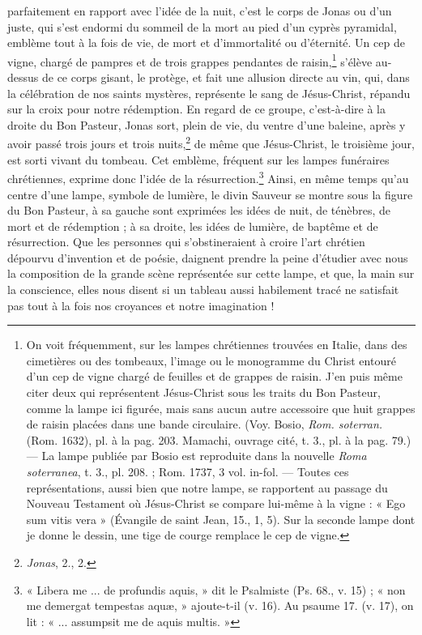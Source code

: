 \documentclass{article}
\begin{document}
parfaitement en rapport avec l'idée de la nuit, c'est le corps de Jonas ou d'un juste, qui s'est endormi du sommeil de la mort au pied d'un cyprès pyramidal, emblème tout à la fois de vie, de mort et d'immortalité ou d'éternité. Un cep de vigne, chargé de pampres et de trois grappes pendantes de raisin,\footnote{On voit fréquemment, sur les lampes chrétiennes trouvées en Italie, dans des cimetières ou des tombeaux, l'image ou le monogramme du Christ entouré d'un cep de vigne chargé de feuilles et de grappes de raisin. J'en puis même citer deux qui représentent Jésus-Christ sous les traits du Bon Pasteur, comme la lampe ici figurée, mais sans aucun autre accessoire que huit grappes de raisin placées dans une bande circulaire. (Voy. Bosio, \emph{Rom. soterran.} (Rom. 1632), pl. à la pag. 203. Mamachi, ouvrage cité, t. 3., pl. à la pag. 79.) --- La lampe publiée par Bosio est reproduite dans la nouvelle \emph{Roma soterranea}, t. 3., pl. 208. ; Rom. 1737, 3 vol. in-fol. --- Toutes ces représentations, aussi bien que notre lampe, se rapportent au passage du Nouveau Testament où Jésus-Christ se compare lui-même à la vigne : « Ego sum vitis vera » (Évangile de saint Jean, 15., 1, 5). Sur la seconde lampe dont je donne le dessin, une tige de courge remplace le cep de vigne.} s'élève au-dessus de ce corps gisant, le protège, et fait une allusion directe au vin, qui, dans la célébration de nos saints mystères, représente le sang de Jésus-Christ, répandu sur la croix pour notre rédemption. En regard de ce groupe, c'est-à-dire à la droite du Bon Pasteur, Jonas sort, plein de vie, du ventre d'une baleine, après y avoir passé trois jours et trois nuits,\footnote{\emph{Jonas}, 2., 2.} de même que Jésus-Christ, le troisième jour, est sorti vivant du tombeau. Cet emblème, fréquent sur les lampes funéraires chrétiennes, exprime donc l'idée de la résurrection.\footnote{« Libera me ... de profundis aquis, » dit le Psalmiste (Ps. 68., v. 15) ; « non me demergat tempestas aquæ, » ajoute-t-il (v. 16). Au psaume 17. (v. 17), on lit : « ... assumpsit me de aquis multis. »} Ainsi, en même temps qu'au centre d'une lampe, symbole de lumière, le divin Sauveur se montre sous la figure du Bon Pasteur, à sa gauche sont exprimées les idées de nuit, de ténèbres, de mort et de rédemption ; à sa droite, les idées de lumière, de baptême et de résurrection. Que les personnes qui s'obstineraient à croire l'art chrétien dépourvu d'invention et de poésie, daignent prendre la peine d'étudier avec nous la composition de la grande scène représentée sur cette lampe, et que, la main sur la conscience, elles nous disent si un tableau aussi habilement tracé ne satisfait pas tout à la fois nos croyances et notre imagination !
\end{document}
